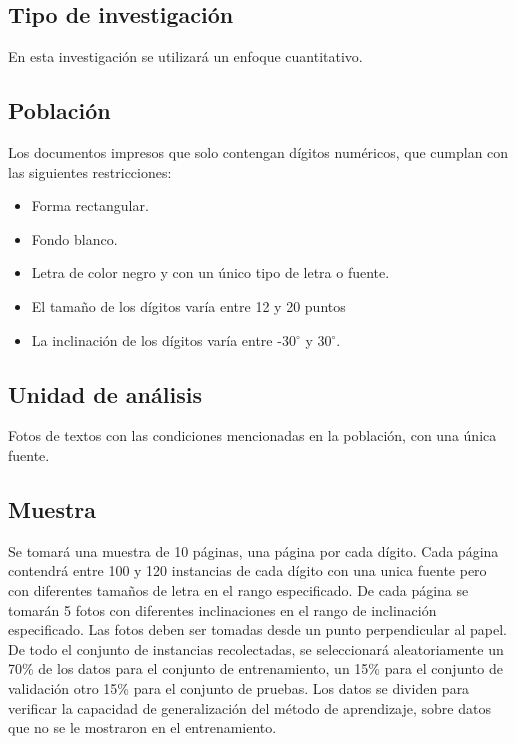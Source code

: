 \documentclass[a4paper, 11pt, oneside]{article}
\begin{document}
	\subsection{Tipo de investigación}
	En esta investigación se utilizará un enfoque cuantitativo.
	
	\subsection{Población}
	Los documentos impresos que solo contengan dígitos numéricos, que cumplan con las siguientes restricciones:
	\begin{itemize}
	\item Forma rectangular.
	\item Fondo blanco.
	\item Letra de color negro y con un único tipo de letra o fuente.
	\item El tamaño de los dígitos varía entre 12 y 20 puntos
	\item La inclinación de los dígitos varía entre -30$^{\circ}$ y 30$^{\circ}$.
	\end{itemize}
	
	\subsection{Unidad de análisis}
	Fotos de textos con las condiciones mencionadas en la población, con una única fuente.

	\subsection{Muestra}
	Se tomará una muestra de 10 páginas, una página por cada dígito. Cada página contendrá entre 100
	y 120 instancias de cada dígito con una unica fuente pero con diferentes tamaños de letra en el
	rango especificado. De cada página se tomarán 5 fotos con diferentes inclinaciones en el rango
	de inclinación especificado. Las fotos deben ser tomadas desde un punto perpendicular al papel.
	De todo el conjunto de instancias recolectadas, se seleccionará aleatoriamente un 70\% de los
	datos para el conjunto de entrenamiento, un 15\% para el conjunto de validación otro 15\% para
	el conjunto de pruebas. Los datos se dividen para verificar la capacidad de generalización del
	método de aprendizaje, sobre datos que no se le mostraron en el entrenamiento.
	
\end{document}
